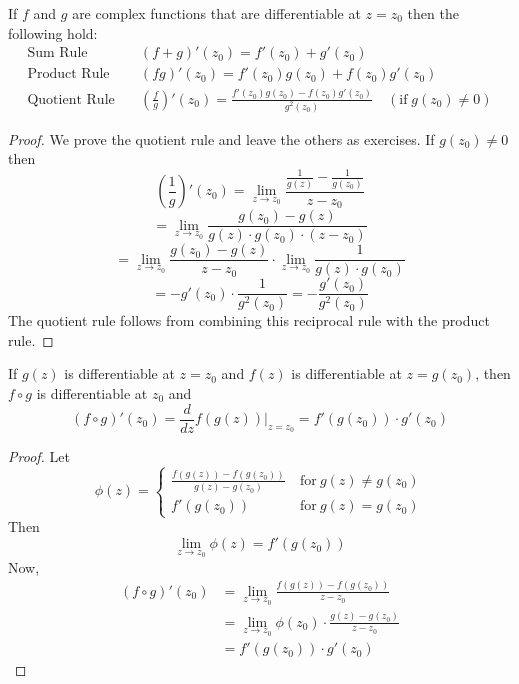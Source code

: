 \documentclass[handout]{ximera}
\begin{document}
\begin{theorem}
If $f$ and $g$ are complex functions that are differentiable at $z = z_0$ then the following hold:
\begin{align*}
\mbox{Sum Rule} & \quad (f+g)'(z_0) = f'(z_0) + g'(z_0)\\[6 pt]
\mbox{Product Rule} & \quad (fg)'(z_0) = f'(z_0)g(z_0) + f(z_0)g'(z_0)\\[6pt]
\mbox{Quotient Rule} &\quad \left (\frac{f}{g}\right)'(z_0) = \frac{f'(z_0)g(z_0) - f(z_0)g'(z_0)}{g^2(z_0)}\quad (\mbox{if} \; g(z_0) \neq 0)
\end{align*}
\end{theorem}

\begin{proof}
We prove the quotient rule and leave the others as exercises. If $g(z_0) \neq 0$ then
\[
\left(\frac{1}{g}\right)'(z_0) = \lim_{z \to z_0} \frac{\frac{1}{g(z)} - \frac{1}{g(z_0)}}{z-z_0}
\]
\[
= \lim_{z \to z_0} \frac{g(z_0)- g(z)}{g(z)\cdot g(z_0) \cdot(z-z_0)}
\]
\[
= \lim_{z \to z_0} \frac{g(z_0)- g(z)}{z-z_0}   \cdot \lim_{z \to z_0} \frac{1}{g(z)\cdot g(z_0)}
\]
\[
= -g'(z_0) \cdot \frac{1}{g^2(z_0)} = -\frac{g'(z_0)}{g^2(z_0)}
\]
The quotient rule follows from combining this reciprocal rule with the product rule.

\end{proof}

\begin{theorem}
If $g(z)$ is differentiable at $z = z_0$ and $f(z)$ is differentiable at $z = g(z_0)$, then
$f \circ g$ is differentiable at $z_0$ and
\[
(f\circ g)'(z_0) = \frac{d}{dz} f(g(z)) \Big|_{z=z_0} = f'(g(z_0)) \cdot g'(z_0)
\]
\end{theorem}

\begin{proof}

Let
\[ \phi(z)  = \left\{
     \begin{array}{lr}
       \frac{f(g(z)) - f(g(z_0))}{g(z) -g(z_0)} & \ \text{for} \  g(z) \neq g(z_0) \\[12pt]
       f'(g(z_0)) & \ \text{for} \ g(z) = g(z_0)
     \end{array}
   \right.
\]
Then
\[
\lim_{z \to z_0} \phi(z) = f'(g(z_0))
\]
Now, 
\begin{align*}
(f\circ g)'(z_0) &= \lim_{z\to z_0} \frac{f(g(z)) - f(g(z_0))}{z-z_0} \\[10pt]
                 &= \lim_{z \to z_0} \phi(z_0) \cdot \frac{g(z) - g(z_0)}{z-z_0} \\[10pt]
                 &= f'(g(z_0)) \cdot g'(z_0)
\end{align*}

\end{proof}
\end{document}
